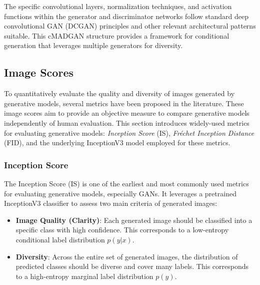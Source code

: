 The specific convolutional layers, normalization techniques, and activation functions within the generator and discriminator networks follow standard deep convolutional GAN (DCGAN) \cite{Radford2015DCGAN} principles and other relevant architectural patterns suitable. This cMADGAN structure provides a framework for conditional generation that leverages multiple generators for diversity.





\subsection{Image Scores}\label{theoretical_image_scores}

To quantitatively evaluate the quality and diversity of images generated by generative models, several metrics have been proposed in the literature. These image scores aim to provide an objective measure to compare generative models independently of human evaluation. This section introduces widely-used metrics for evaluating generative models: \textit{Inception Score} (IS), \textit{Fréchet Inception Distance} (FID), and the underlying InceptionV3 model employed for these metrics.

\subsubsection[Inception Score - IS]{Inception Score}
The Inception Score (IS) \cite{salimans2016improvedtechniquestraininggans} is one of the earliest and most commonly used metrics for evaluating generative models, especially GANs. It leverages a pretrained InceptionV3 classifier to assess two main criteria of generated images:

\begin{itemize}
    \item \textbf{Image Quality (Clarity)}: Each generated image should be classified into a specific class with high confidence. This corresponds to a low-entropy conditional label distribution \( p(y|x) \).
    \item \textbf{Diversity}: Across the entire set of generated images, the distribution of predicted classes should be diverse and cover many labels. This corresponds to a high-entropy marginal label distribution \( p(y) \).
\end{itemize}

